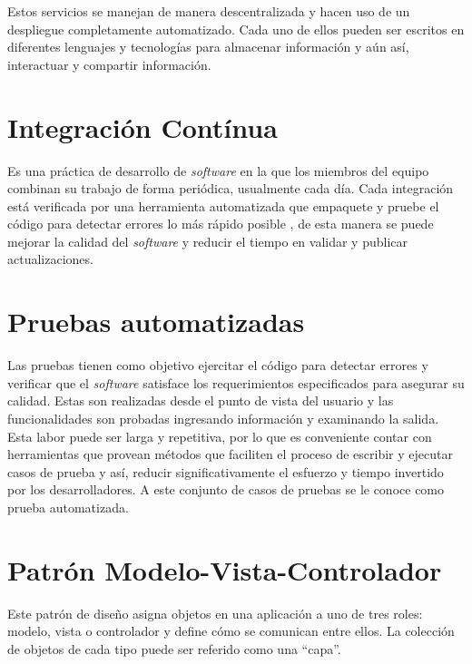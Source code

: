 Estos servicios se manejan de manera descentralizada y hacen uso de un despliegue completamente automatizado. Cada uno de ellos pueden ser escritos en diferentes lenguajes y tecnologías para almacenar información y aún así, interactuar y compartir información. \cite{Microservices2}

\section{Integración Contínua}

Es una práctica de desarrollo de \textit{software} en la que los miembros del equipo combinan su trabajo de forma periódica, usualmente cada día. Cada integración está verificada por una herramienta automatizada que empaquete y pruebe el código para detectar errores lo más rápido posible \cite{Integracion_Continua}, de esta manera se puede mejorar la calidad del \textit{software} y reducir el tiempo en validar y publicar actualizaciones.

\section{Pruebas automatizadas}

Las pruebas tienen como objetivo ejercitar el código para detectar errores y verificar que el \textit{software} satisface los requerimientos especificados para asegurar su calidad. Estas son realizadas desde el punto de vista del usuario y las funcionalidades son probadas ingresando información y examinando la salida. \cite{Pruebas_Automatizadas}\\

Esta labor puede ser larga y repetitiva, por lo que es conveniente contar con herramientas que provean métodos que faciliten el proceso de escribir y  ejecutar casos de prueba y así, reducir significativamente el esfuerzo y tiempo invertido por los desarrolladores. \cite{Pruebas_Automatizadas} A este conjunto de casos de pruebas se le conoce como prueba automatizada.

\section{Patrón Modelo-Vista-Controlador}

Este patrón de diseño asigna objetos en una aplicación a uno de tres roles: modelo, vista o controlador y define cómo se comunican entre ellos. La colección de objetos de cada tipo puede ser referido como una “capa”.\cite{MVC}


